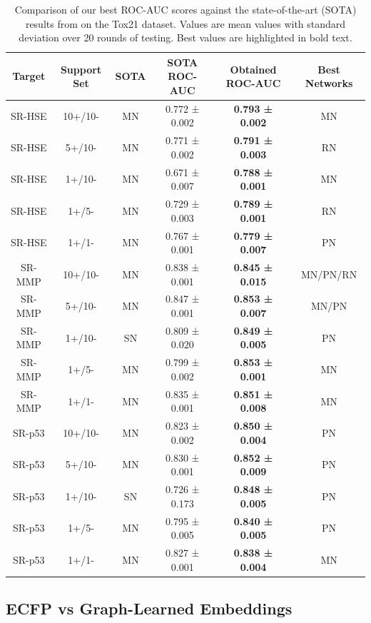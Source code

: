 \documentclass[journal=jcisd8,manuscript=article]{achemso} %
\begin{document}
\begin{table}[ht]
    \centering
    \begin{tabular}{@{}cccccc@{}}
    \hline
    \textbf{Target} & \textbf{Support Set} & \textbf{SOTA} & \textbf{SOTA ROC-AUC} & \textbf{Obtained ROC-AUC} & \textbf{Best Networks} \\
    \hline  
    SR-HSE & 10+/10- & MN & 0.772 ± 0.002 & \textbf{0.793 ± 0.002} & MN \\
    SR-HSE & 5+/10- & MN & 0.771 ± 0.002 & \textbf{0.791 ± 0.003} & RN \\
    SR-HSE & 1+/10- & MN & 0.671 ± 0.007 & \textbf{0.788 ± 0.001} & MN \\
    SR-HSE & 1+/5- & MN & 0.729 ± 0.003 & \textbf{0.789 ± 0.001} & RN \\
    SR-HSE & 1+/1- & MN & 0.767 ± 0.001 & \textbf{0.779 ± 0.007} & PN \\
    SR-MMP & 10+/10- & MN & 0.838 ± 0.001 & \textbf{0.845 ± 0.015} & MN/PN/RN \\
    SR-MMP & 5+/10- & MN & 0.847 ± 0.001 & \textbf{0.853 ± 0.007} & MN/PN \\
    SR-MMP & 1+/10- & SN & 0.809 ± 0.020 & \textbf{0.849 ± 0.005} & PN \\
    SR-MMP & 1+/5- & MN & 0.799 ± 0.002 & \textbf{0.853 ± 0.001} & MN \\
    SR-MMP & 1+/1- & MN & 0.835 ± 0.001 & \textbf{0.851 ± 0.008} & MN \\
    SR-p53 & 10+/10- & MN & 0.823 ± 0.002 & \textbf{0.850 ± 0.004} & PN \\
    SR-p53 & 5+/10- & MN & 0.830 ± 0.001 & \textbf{0.852 ± 0.009} & PN \\
    SR-p53 & 1+/10- & SN & 0.726 ± 0.173 & \textbf{0.848 ± 0.005} & PN \\
    SR-p53 & 1+/5- & MN & 0.795 ± 0.005 & \textbf{0.840 ± 0.005} & PN \\
    SR-p53 & 1+/1- & MN & 0.827 ± 0.001 & \textbf{0.838 ± 0.004} & MN \\
    \hline  
    \end{tabular}
    \caption[Comparing our best ROC-AUC scores with the SOTA results on Tox21.]{Comparison of our best ROC-AUC scores against the state-of-the-art (SOTA) results from \citet{altae2017low} on the Tox21 dataset. Values are mean values with standard deviation over 20 rounds of testing. Best values are highlighted in bold text.}
    \label{table:Tox21-sota-ours}
\end{table}

\subsection{ECFP vs Graph-Learned Embeddings}
\end{document}
